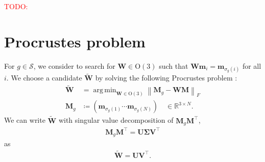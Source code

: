 \documentclass[a4paper, 11pt]{article}
\theoremstyle{definition}
\newcommand{\todo}[1]{\textcolor{red}{TODO: #1}}
\newcommand{\norm}[1]{\left\lVert#1\right\rVert}
\DeclareMathOperator*{\argmin}{arg\,min}
\begin{document}
\todo{}

\appendix

\section{\label{appx:procrustes}Procrustes problem}

For $g \in \mathcal{S}$, we consider to search for $\bm{W} \in \mathrm{O}(3)$ such that $\bm{W} \bm{m}_{i} = \bm{m}_{\sigma_{g}(i)}$ for all $i$.
We choose a candidate $\tilde{\bm{W}}$ by solving the following Procrustes problem \cite{10.1093/acprof:oso/9780198510581.001.0001}:
\begin{align}
  \tilde{\bm{W}}
    &=\argmin_{ \bm{W} \in \mathrm{O}(3) } \norm{ \bm{M}_{g} - \bm{W} \bm{M} }_{F} \\
  \bm{M}_{g}
    &\coloneqq \left( \bm{m}_{\sigma_{g}(1)} \cdots \bm{m}_{\sigma_{g}(N)} \right)
    \quad \in \mathbb{R}^{3 \times N}.
\end{align}
We can write $\tilde{\bm{W}}$ with singular value decomposition of $\bm{M}_{g} \bm{M}^{\top}$,
\begin{align}
  \bm{M}_{g} \bm{M}^{\top}
    = \bm{U} \bm{\Sigma} \bm{V}^{\top}
\end{align}
as
\begin{align}
  \tilde{\bm{W}} = \bm{U} \bm{V}^{\top}.
\end{align}




\end{document}
